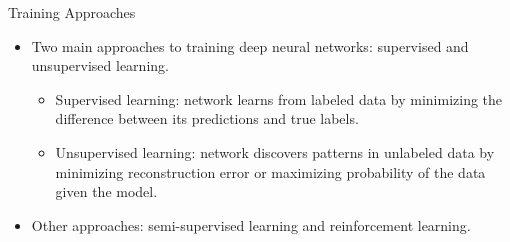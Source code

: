 \documentclass{beamer}
\begin{document}
\begin{frame}{Training Approaches}
    \begin{itemize}
    \item Two main approaches to training deep neural networks: supervised and unsupervised learning.
    
    \begin{itemize}
        \item Supervised learning: network learns from labeled data by minimizing the difference between its predictions and true labels.
        \item Unsupervised learning: network discovers patterns in unlabeled data by minimizing reconstruction error or maximizing probability of the data given the model.
    \end{itemize}
    
    \item Other approaches: semi-supervised learning and reinforcement learning.
    \end{itemize}
\end{frame}
\end{document}
